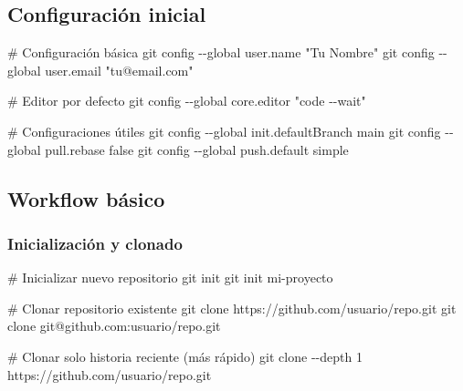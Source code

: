 \documentclass[
  11pt,
  letterpaper,
  oneside,
  openany]{scrbook}
\newenvironment{Shaded}{}{}
\newcommand{\AttributeTok}[1]{\textcolor[rgb]{0.84,0.23,0.29}{#1}}
\newcommand{\CommentTok}[1]{\textcolor[rgb]{0.42,0.45,0.49}{#1}}
\newcommand{\FunctionTok}[1]{\textcolor[rgb]{0.44,0.26,0.76}{#1}}
\newcommand{\NormalTok}[1]{\textcolor[rgb]{0.14,0.16,0.18}{#1}}
\newcommand{\StringTok}[1]{\textcolor[rgb]{0.01,0.18,0.38}{#1}}
\begin{document}
\subsection{Configuración inicial}\label{configuraciuxf3n-inicial-2}

\begin{Shaded}
\begin{Highlighting}[]
\CommentTok{\# Configuración básica}
\FunctionTok{git}\NormalTok{ config }\AttributeTok{{-}{-}global}\NormalTok{ user.name }\StringTok{"Tu Nombre"}
\FunctionTok{git}\NormalTok{ config }\AttributeTok{{-}{-}global}\NormalTok{ user.email }\StringTok{"tu@email.com"}

\CommentTok{\# Editor por defecto}
\FunctionTok{git}\NormalTok{ config }\AttributeTok{{-}{-}global}\NormalTok{ core.editor }\StringTok{"code {-}{-}wait"}

\CommentTok{\# Configuraciones útiles}
\FunctionTok{git}\NormalTok{ config }\AttributeTok{{-}{-}global}\NormalTok{ init.defaultBranch main}
\FunctionTok{git}\NormalTok{ config }\AttributeTok{{-}{-}global}\NormalTok{ pull.rebase false}
\FunctionTok{git}\NormalTok{ config }\AttributeTok{{-}{-}global}\NormalTok{ push.default simple}
\end{Highlighting}
\end{Shaded}

\subsection{Workflow básico}\label{workflow-buxe1sico}

\subsubsection{Inicialización y
clonado}\label{inicializaciuxf3n-y-clonado}

\begin{Shaded}
\begin{Highlighting}[]
\CommentTok{\# Inicializar nuevo repositorio}
\FunctionTok{git}\NormalTok{ init}
\FunctionTok{git}\NormalTok{ init mi{-}proyecto}

\CommentTok{\# Clonar repositorio existente}
\FunctionTok{git}\NormalTok{ clone https://github.com/usuario/repo.git}
\FunctionTok{git}\NormalTok{ clone git@github.com:usuario/repo.git}

\CommentTok{\# Clonar solo historia reciente (más rápido)}
\FunctionTok{git}\NormalTok{ clone }\AttributeTok{{-}{-}depth}\NormalTok{ 1 https://github.com/usuario/repo.git}
\end{Highlighting}
\end{Shaded}
\end{document}

